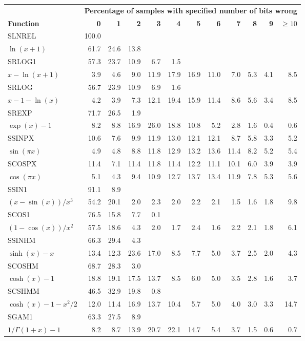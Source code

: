 \documentclass[twoside]{MATH77}
\begin{document}
\begin{table*}
\begin{center}
\begin{tabular}{l*{11}{r}}
 & \multicolumn{11}{c}{\bf Percentage of samples with specified number of
bits wrong\rule[-8pt]{0pt}{8pt}}\\
{\bf Function} & {\bf 0} & {\bf 1} & {\bf 2} & {\bf 3} & {\bf 4} &
{\bf 5} & {\bf 6} & {\bf 7} & {\bf 8} & {\bf 9} & {\bf $\geq 10$}\\
SLNREL & 100.0\\
$\ln (x+1)$ & 61.7 & 24.6 & 13.8\\
SRLOG1 & 57.3 & 23.7 & 10.9 & 6.7 & 1.5\\
$x-\ln (x+1)$ & 3.9 & 4.6 & 9.0 & 11.9 & 17.9 & 16.9 & 11.0 & 7.0 & 5.3 &
4.1 & 8.5\\
SRLOG & 56.7 & 23.9 & 10.9 & 6.9 & 1.6\\
$x-1-\ln (x)$ & 4.2 & 3.9 & 7.3 & 12.1 & 19.4 & 15.9 & 11.4 & 8.6 & 5.6 &
3.4 & 8.5\\
SREXP & 71.7 & 26.5 & 1.9\\
$\exp (x)-1$ & 8.2 & 8.8 & 16.9 & 26.0 & 18.8 & 10.8 & 5.2 & 2.8 & 1.6 &
0.4 & 0.6\\
SSINPX & 10.6 & 7.6 & 9.9 & 11.9 & 13.0 & 12.1 & 12.1 & 8.7 & 5.8 & 3.3 & 5.2\\
$\sin (\pi x)$ & 4.9 & 4.8 & 8.8 & 11.8 & 12.9 & 13.2 & 13.6 & 11.4 &
8.2 & 5.2 & 5.4\\
SCOSPX & 11.4 & 7.1 & 11.4 & 11.8 & 11.4 & 12.2 & 11.1 & 10.1 & 6.0 &
3.9 & 3.9\\
$\cos (\pi x)$ & 5.1 & 4.3 & 9.4 & 10.9 & 12.7 & 13.7 & 13.4 & 11.9 &
7.8 & 5.3 & 5.6\\
SSIN1 & 91.1 & 8.9\\
$(x-\sin (x))/x^3$ & 54.2 & 20.1 & 2.0 & 2.3 & 2.0 & 2.2 & 2.1 & 1.5 &
1.6 & 1.8 & 9.8\\
SCOS1 & 76.5 & 15.8 & 7.7 & 0.1\\
$(1-\cos (x))/x^2$ & 57.5 & 18.6 & 4.3 & 2.0 & 1.7 & 2.4 & 1.6 & 2.2 &
2.1 & 1.8 & 6.1\\
SSINHM & 66.3 & 29.4 & 4.3\\
$\sinh(x)-x$ & 13.4 & 12.3 & 23.6 & 17.0 & 8.5 & 7.7 & 5.0 & 3.7 & 2.5 &
2.0 & 4.3\\
SCOSHM & 68.7 & 28.3 & 3.0\\
$\cosh(x)-1$ & 18.8 & 19.1 & 17.5 & 13.7 & 8.5 & 6.0 & 5.0 & 3.5 & 2.8 &
1.6 & 3.7\\
SCSHMM & 46.5 & 32.9 & 19.8 & 0.8\\
$\cosh(x)-1-x^2/2$ & 12.0 & 11.4 & 16.9 & 13.7 & 10.4 & 5.7 & 5.0 & 4.0 &
3.0 & 3.3 & 14.7\\
SGAM1 & 63.3 & 27.5 & 8.9\\
$1/\Gamma (1+x)-1$ & 8.2 & 8.7 & 13.9 & 20.7 & 22.1 & 14.7 & 5.4 & 3.7 &
1.5 & 0.6 & 0.7\\
\end{tabular}
\end{center}\vspace{-10pt}
\end{table*}
\end{document}
